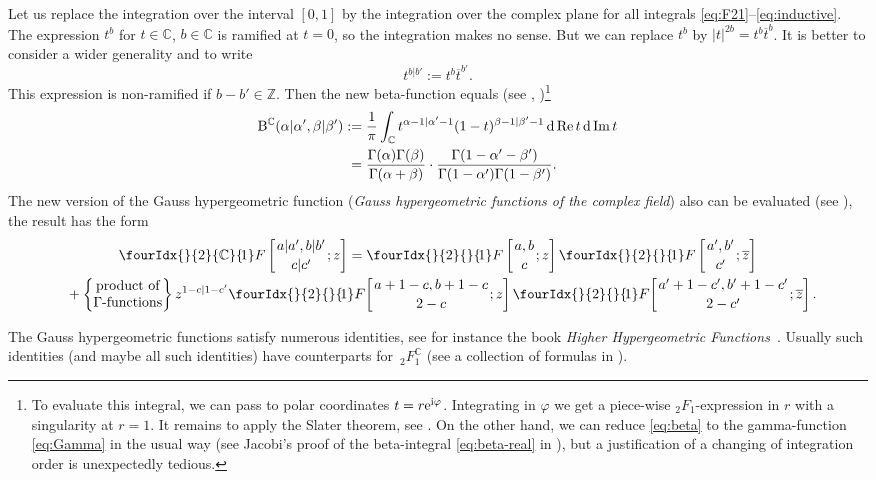 \documentclass[pdftex]{sigma}
\numberwithin{equation}{section}
\renewcommand{\Re}{\mathop {\mathrm {Re}}\nolimits}
\newcommand{\hyp}[2]{\fourIdx{}{#1}{}{\!#2}F}
\newcommand{\hypc}[2]{\fourIdx{}{#1}{\C}{\!#2}F}
\def\ov{\overline}
\renewcommand{\Re}{\mathop {\mathrm {Re}}\nolimits}
\renewcommand{\Im}{\mathop {\mathrm {Im}}\nolimits}
\def\C {{\mathbb C }}
\def\Z{{\mathbb Z}}
\def\phi{\varphi}
\def\B{\mathrm B}
\def\B{\mathrm{B}}
\begin{document}
Let us replace the integration over the interval $[0,1]$ by the
integration over the complex plane for all integrals \eqref{eq:F21}--\eqref{eq:inductive}.
The expression $t^b$ for $t\in\C$, $b\in\C$ is ramified at $t=0$,
so the integration makes no sense.
But we can replace $t^b$ by $|t|^{2b}=t^b \ov t^b$.
It is better to consider a wider generality and to write
\[
t^{b|b'}:=t^b \ov t^{b'}.
\]
This expression is non-ramified if $b-b'\in\Z$.
Then the new beta-function equals
(see \cite[Section~II.3.7]{GGV}, \cite[Section~1.6]{GGR})\footnote{To evaluate
this integral, we can pass to polar coordinates
$t=r{\rm e}^{{\rm i}\phi}$. Integrating in $\phi$ we get a piece-wise $_2F_1$-expression
in $r$ with a singularity at $r=1$. It remains to apply the Slater theorem,
see \cite[Theorem~4.8.1, namely formula~(4.8.7)]{Sla}.
On the other hand, we can reduce \eqref{eq:beta} to the gamma-function
\eqref{eq:Gamma} in the usual way (see Jacobi's proof of the
beta-integral \eqref{eq:beta-real} in \cite[Section~I.1]{AAR}),
but a justification of a changing of integration order is unexpectedly
tedious.}
\begin{align}
\B^\C(\alpha|\alpha',\beta|\beta')&:=\frac 1\pi
\int_\C t^{\alpha-1|\alpha'-1} (1-t)^{\beta-1|\beta'-1}\, {\rm d}\Re t\,{\rm d}\Im t \notag\\
&\hphantom{:}=
\frac{\Gamma(\alpha)\Gamma(\beta)}{\Gamma(\alpha+\beta)}\cdot
\frac{\Gamma(1-\alpha'-\beta')}{\Gamma(1-\alpha')\Gamma(1-\beta')}.\label{eq:beta}
\end{align}
The new version of the Gauss hypergeometric function
(\textit{Gauss hypergeometric functions of the complex field})
also can be evaluated (see \cite[Theorem~3.9]{MN}),
the result has the form
\begin{gather}
\hypc{2}{1}\left[\genfrac{}{}{0pt}{}{a|a',b|b'}{c|c'};z\right]
=\hyp{2}{1}\left[\genfrac{}{}{0pt}{}{a,b}{c};z\right]
\hyp{2}{1}\left[\genfrac{}{}{0pt}{}{a',b'}{c'};\ov z\right] \nonumber\\
{}+
\left\{ \begin{matrix}
\text{product of}\\
\text{$\Gamma$-functions}
\end{matrix}
\right\} z^{1-c|1-c'}
\hyp{2}{1}\!\left[\genfrac{}{}{0pt}{}{a+1-c,b+1-c}{2-c};z\right]
\hyp{2}{1}\!\left[\genfrac{}{}{0pt}{}{a'+1-c',b'+1-c'}{2-c'};\ov z\right].\!\!\!\label{u}
\end{gather}

The Gauss hypergeometric functions satisfy numerous identities,
see for instance the book \textit{Higher Hypergeometric Functions}~\cite[Chapter~2]{HTF1}.
Usually such identities (and maybe all such identities) have counterparts
for~$_2F_1^\C$ (see a collection of formulas in \cite[Section~3]{MN}).
\end{document}
